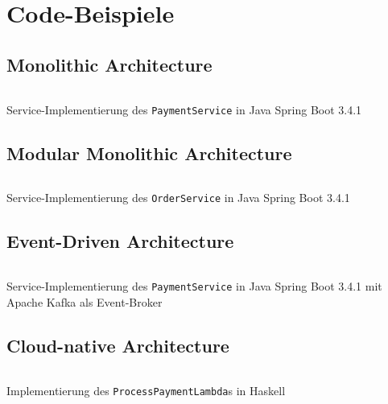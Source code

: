 \documentclass[acmtog]{acmart}
\begin{document}



\appendix

\section{Code-Beispiele}

\subsection{Monolithic Architecture}
\label{app:code:monolithic:paymentservice}
\begin{listing}[H]
  \tiny
  \inputminted[linenos=true]{java}{code/monolithic/PaymentService.java}
  \caption{Service-Implementierung des \texttt{PaymentService} in Java Spring Boot 3.4.1}
\end{listing}

\subsection{Modular Monolithic Architecture}
\label{app:code:modular:orderservice}
\begin{listing}[H]
  \tiny
  \inputminted[linenos=true]{java}{code/modulithic/OrderServiceImpl.java}
  \caption{Service-Implementierung des \texttt{OrderService} in Java Spring Boot 3.4.1}
\end{listing}

\subsection{Event-Driven Architecture}
\label{app:code:eda:paymentservice}
\begin{listing}[H]
  \tiny
  \inputminted[linenos=true]{java}{code/eda/PaymentService.java}
  \caption{Service-Implementierung des \texttt{PaymentService} in Java Spring Boot 3.4.1 mit Apache Kafka als Event-Broker}
\end{listing}

\subsection{Cloud-native Architecture}
\label{app:code:cloudnative:paymentservice}
\begin{listing}[H]
  \tiny
  \inputminted[linenos=true]{haskell}{code/cloud/PaymentService.hs}
  \caption{Implementierung des \texttt{ProcessPaymentLambda}s in Haskell}
\end{listing}
\end{document}
